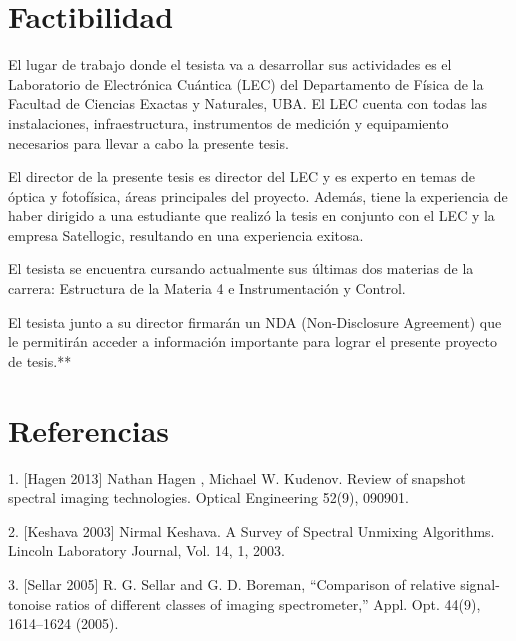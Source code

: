 \documentclass{ctuthesis}
\begin{document}

\section*{Factibilidad}

\hspace{0.5cm}El lugar de trabajo donde el tesista va a desarrollar sus 
actividades es el 
Laboratorio de Electrónica Cuántica (LEC) del Departamento de Física de la 
Facultad de Ciencias Exactas y Naturales, UBA. El LEC cuenta con todas las 
instalaciones, infraestructura, instrumentos de medición y equipamiento 
necesarios para llevar a cabo la presente tesis. 

El director de la presente tesis es director del LEC y es experto en temas de 
óptica y fotofísica, áreas principales del proyecto. Además, tiene la 
experiencia de haber dirigido a una estudiante que realizó la tesis en conjunto 
con el LEC y la empresa Satellogic, resultando en una experiencia exitosa.

El tesista se encuentra cursando actualmente sus últimas dos materias de la 
carrera: 
Estructura de la Materia 4 e Instrumentación y Control.

El tesista junto a su director firmarán un NDA (Non-Disclosure Agreement) que 
le permitirán acceder a información importante para lograr el presente proyecto 
de tesis.**

\section*{Referencias}
1. [Hagen 2013] Nathan Hagen , Michael W. Kudenov. Review of snapshot spectral imaging technologies. Optical Engineering 52(9), 090901.

2. [Keshava 2003] Nirmal Keshava. A Survey of Spectral Unmixing Algorithms. Lincoln Laboratory Journal, Vol. 14, 1, 2003.

3. [Sellar 2005] R. G. Sellar and G. D. Boreman, “Comparison of relative signal-tonoise
ratios of different classes of imaging spectrometer,” Appl. Opt. 44(9), 1614–1624 (2005).
\end{document}
